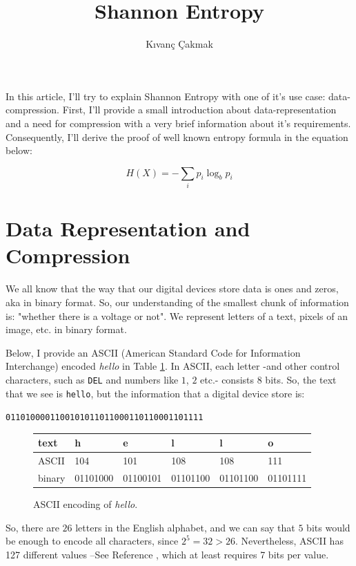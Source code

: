\documentclass[11pt]{article}
\title{\textbf{Shannon Entropy}}
\author{K{\i}van\c{c} \c{C}akmak\\}
\date{}
\begin{document}
\maketitle

In this article, I'll try to explain Shannon Entropy with one of it's use case: data-compression. First, I'll provide a small introduction about data-representation and a need for compression with a very brief information about it's requirements. Consequently, I'll derive the proof of well known entropy formula in the equation below:

\begin{equation}
H(X) = -\sum_{i}p_{i}\log_{b}p_{i}
\label{Eq:entropy}
\end{equation}

\section{Data Representation and Compression}

We all know that the way that our digital devices store data is ones and zeros, aka in binary format. So, our understanding of the smallest chunk of information is: "whether there is a voltage or not". 
We represent letters of a text, pixels of an image, etc. in binary format. 

Below, I provide an ASCII (American Standard Code for Information Interchange) encoded \textit{hello} in Table \ref{table:hello}. In ASCII, each letter -and other control characters, such as \texttt{DEL} and numbers like $1$, $2$ etc.- consists $8$ bits. So, the text that we see is \texttt{hello}, but the information that a digital device store is: 
\begin{center}
    \texttt{0110100001100101011011000110110001101111}
\end{center}

\begin{figure}
\begin{tabular}{| l | l | l | l | l | l |}
 \hline
  text   & h & e & l & l & o\\ \hline
  ASCII  & 104 & 101 & 108 & 108 & 111 \\ \hline 
  binary & 01101000 & 01100101 & 01101100 & 01101100 & 01101111 \\ 
  \hline
\end{tabular}
\caption{ASCII encoding of \textit{hello}.}
\label{table:hello}
\end{figure}

So, there are $26$ letters in the English alphabet, and we can say that $5$ bits would be enough to encode all characters, since $2^{5} = 32 > 26$. Nevertheless, ASCII has 127 different values --See Reference \cite{ascii}, which at least requires 7 bits per value. 
\end{document}

